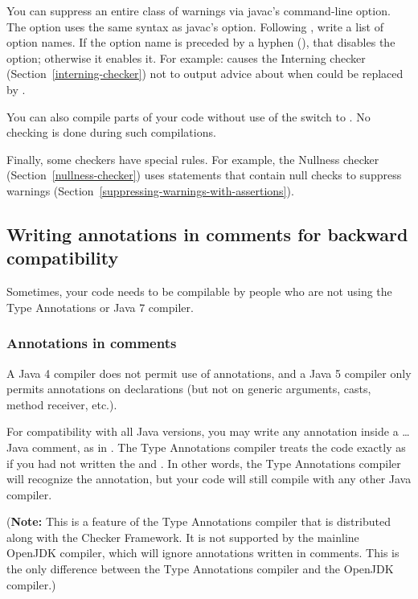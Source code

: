 You can suppress an entire class of warnings via javac's 
command-line option.  The  option uses the same syntax as
javac's  option.
Following , write a list of option
names.  If the option name is preceded by a hyphen (\code{-}), that
disables the option; otherwise it enables it.  For example:
 causes the Interning checker
(Section~\ref{interning-checker}) not to output advice about when 
could be replaced by .

You can also compile parts of your code without use of the
 switch to .  No checking is done during
such compilations.

Finally, some checkers have special rules.  For example, the Nullness
checker (Section~\ref{nullness-checker}) uses  statements that contain
null checks to suppress warnings
(Section~\ref{suppressing-warnings-with-assertions}).



\subsection{Writing annotations in comments for backward compatibility\label{annotations-in-comments}}

Sometimes, your code needs to be compilable by people who are not
using the Type Annotations or Java 7 compiler.


\subsubsection{Annotations in comments}

A Java 4 compiler does not permit use of
annotations, and a Java 5 compiler only permits annotations on
declarations (but not on generic arguments, casts, method receiver, etc.).

For compatibility with all Java versions, you may write any annotation inside a
\code{/*}\ldots\code{*/} Java comment, as in .
The Type Annotations compiler treats the code exactly as if you had not written the
\code{/*} and \code{*/}.
In other words, the Type Annotations compiler will recognize the
annotation, but your code will still compile with any other Java compiler.

(\textbf{Note:} This is a feature of the Type Annotations compiler that is
distributed along with the Checker Framework.  It is not supported by the
mainline OpenJDK compiler, which will ignore annotations written in
comments.  This is the only difference between the Type Annotations
compiler and the OpenJDK compiler.)

